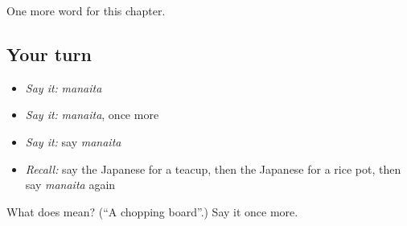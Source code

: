 \begin{grammarlens}[title={What you've built}]
One more word for this chapter.
\end{grammarlens}

\subsection*{Your turn}
\begin{itemize}
\raggedright
  \item \emph{Say it:} \emph{manaita}
  \item \emph{Say it:} \emph{manaita}, once more
  \item \emph{Say it:} say \emph{manaita}
  \item \emph{Recall:} say the Japanese for a teacup, then the Japanese for a rice pot, then say \emph{manaita} again
\end{itemize}

\begin{tcolorbox}[breakable,colback=teal!4,colframe=teal!35!black,title={Before you move on}]
What does  mean? (\textquotedblleft{}A chopping board\textquotedblright{}.) Say it once more.
\end{tcolorbox}

